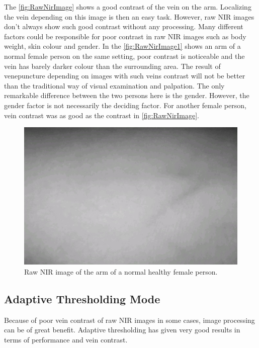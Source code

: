 The \autoref{fig:RawNirImage} shows a good contrast of the vein on the arm. Localizing the vein depending on this image is then an easy task. However, raw NIR images don’t always show such good contrast without any processing. Many different factors could be responsible for poor contrast in raw NIR images such as body weight, skin colour and gender.  In the \autoref{fig:RawNirImage1}  shows an arm of a normal female person on the same setting, poor contrast is noticeable and the vein has barely darker colour than the surrounding area.
The result of venepuncture depending on images with such veins contrast will not be better than the traditional way of visual examination and palpation. The only remarkable difference between the two persons here is the gender. However, the gender factor is not necessarily the deciding factor. For another female person, vein contrast was as good as the contrast in \autoref{fig:RawNirImage}.

\begin{figure}[H]
\centering
\includegraphics[scale=0.7]{figures/nirZein.JPG}
\caption[Raw NIR Image of an Arm with Poor Vein Contrast]{Raw NIR image of the arm of a normal healthy female person.}\label{fig:RawNirImage1}
\end{figure}

\subsection{Adaptive Thresholding Mode}
Because of poor vein contrast of raw NIR images in some cases, image processing can be of great benefit. Adaptive thresholding has given very good results in terms of performance and vein contrast.
